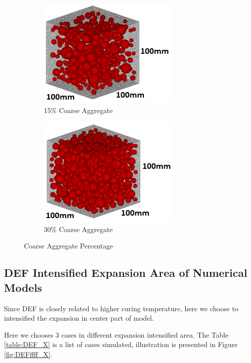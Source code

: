 \begin{figure}[!h]
\centering
\begin{subfigure}{.5\textwidth}
  \centering
  \includegraphics[width=.6\linewidth]{Files/Aggregate/A15.png}
  \caption{15\% Coarse Aggregate}

\end{subfigure}%
\begin{subfigure}{.5\textwidth}
  \centering
  \includegraphics[width=.6\linewidth]{Files/Aggregate/A30.png}
  \caption{30\% Coarse Aggregate}
\end{subfigure}

\caption{Coarse Aggregate Percentage}
\label{skjdfhlk}
\end{figure}

\subsection{DEF Intensified Expansion Area of Numerical Models}

Since DEF is closely related to higher curing temperature, here we choose to intensified the expansion in center part of model.

Here we chooses 3 cases in different expansion intensified area. The Table \ref{table:DEF_X} is a list of cases simulated, illustration is presented in Figure \ref{fig:DEFffff_X}.

